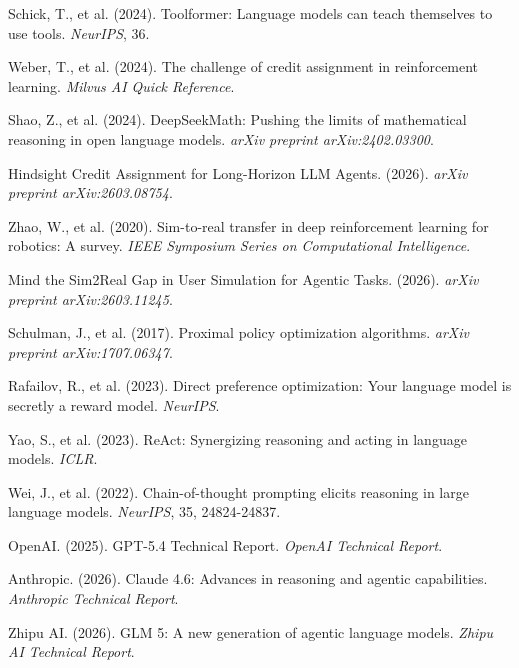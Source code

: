 \documentclass{article}
\begin{document}
\begin{enumerate}[label={[\arabic*]}]
    \item Schick, T., et al. (2024). Toolformer: Language models can teach themselves to use tools. \textit{NeurIPS}, 36.
    
    \item Weber, T., et al. (2024). The challenge of credit assignment in reinforcement learning. \textit{Milvus AI Quick Reference}.
    
    \item Shao, Z., et al. (2024). DeepSeekMath: Pushing the limits of mathematical reasoning in open language models. \textit{arXiv preprint arXiv:2402.03300}.
    
    \item Hindsight Credit Assignment for Long-Horizon LLM Agents. (2026). \textit{arXiv preprint arXiv:2603.08754}.
    
    \item Zhao, W., et al. (2020). Sim-to-real transfer in deep reinforcement learning for robotics: A survey. \textit{IEEE Symposium Series on Computational Intelligence}.
    
    \item Mind the Sim2Real Gap in User Simulation for Agentic Tasks. (2026). \textit{arXiv preprint arXiv:2603.11245}.
    
    \item Schulman, J., et al. (2017). Proximal policy optimization algorithms. \textit{arXiv preprint arXiv:1707.06347}.
    
    \item Rafailov, R., et al. (2023). Direct preference optimization: Your language model is secretly a reward model. \textit{NeurIPS}.
    
    \item Yao, S., et al. (2023). ReAct: Synergizing reasoning and acting in language models. \textit{ICLR}.
    
    \item Wei, J., et al. (2022). Chain-of-thought prompting elicits reasoning in large language models. \textit{NeurIPS}, 35, 24824-24837.
    
    \item OpenAI. (2025). GPT-5.4 Technical Report. \textit{OpenAI Technical Report}.
    
    \item Anthropic. (2026). Claude 4.6: Advances in reasoning and agentic capabilities. \textit{Anthropic Technical Report}.
    
    \item Zhipu AI. (2026). GLM 5: A new generation of agentic language models. \textit{Zhipu AI Technical Report}.
    

\end{enumerate}
\end{document}
